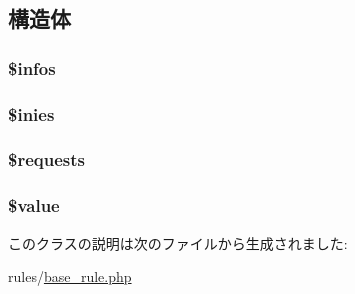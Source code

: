 \subsection{構造体}
\hypertarget{class_rule_base_af24aefa35fa703a1521c8145fe8fa082}{
\subsubsection[{\$infos}]{\setlength{\rightskip}{0pt plus 5cm}\$infos}}
\label{class_rule_base_af24aefa35fa703a1521c8145fe8fa082}
\hypertarget{class_rule_base_ab7baba555b2cbc79c5ff9ef47baee3d5}{
\subsubsection[{\$inies}]{\setlength{\rightskip}{0pt plus 5cm}\$inies}}
\label{class_rule_base_ab7baba555b2cbc79c5ff9ef47baee3d5}
\hypertarget{class_rule_base_a28d7688bd020a3b104adc19d1e08df96}{
\subsubsection[{\$requests}]{\setlength{\rightskip}{0pt plus 5cm}\$requests}}
\label{class_rule_base_a28d7688bd020a3b104adc19d1e08df96}
\hypertarget{class_rule_base_a0f298096f322952a72a50f98a74c7b60}{
\subsubsection[{\$value}]{\setlength{\rightskip}{0pt plus 5cm}\$value}}
\label{class_rule_base_a0f298096f322952a72a50f98a74c7b60}


このクラスの説明は次のファイルから生成されました\-:\begin{DoxyCompactItemize}
\item 
rules/\hyperlink{base__rule_8php}{base\-\_\-rule.\-php}\end{DoxyCompactItemize}
